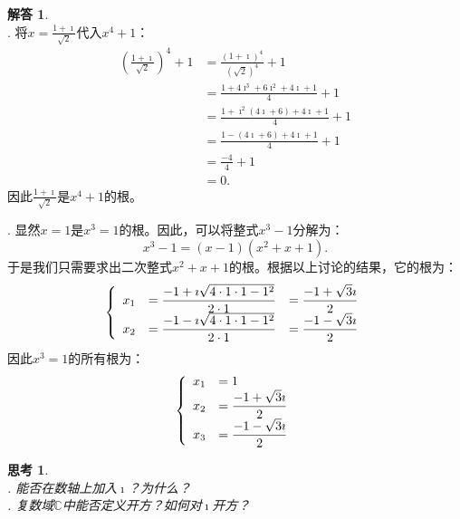 \documentclass[12pt,UTF8]{ctexbook}
\theoremstyle{definition}
\newtheorem*{so}{解答}
\theoremstyle{plain}
\newtheorem{sk}{思考}[section]
\begin{document}
\begin{so}
    \mbox{} \\
    . 将$x = \displaystyle\frac{1 + \imath}{\sqrt{2}}$代入$x^4 + 1$：
    \begin{align*}
        \left(\frac{1 + \imath}{\sqrt{2}}\right)^4 + 1 &= \frac{\left(1 + \imath\right)^4}{\left(\sqrt{2}\right)^4} + 1 \\
        &= \frac{1 + 4\imath^3 + 6\imath^2 + 4\imath + 1}{4} + 1 \\
        &= \frac{1 + \imath^2 (4\imath + 6) + 4\imath + 1}{4} + 1 \\
        &= \frac{1 - (4\imath + 6) + 4\imath + 1}{4} + 1 \\
        &= \frac{- 4}{4} + 1 \\
        &= 0.
    \end{align*}
    因此$\displaystyle\frac{1 + \imath}{\sqrt{2}}$是$x^4 + 1$的根。

    . 显然$x = 1$是$x^3 = 1$的根。因此，可以将整式$x^3 - 1$分解为：
    $$ x^3 - 1 = (x - 1)(x^2 + x + 1).$$
    于是我们只需要求出二次整式$x^2 + x + 1$的根。根据以上讨论的结果，它的根为：
    $$
    \left\{
        \begin{array}[]{rll}
            x_1 &= \displaystyle\frac{-1 + \imath \sqrt{4\cdot 1\cdot 1 - 1^2} }{2\cdot 1} &= \displaystyle\frac{-1 + \sqrt{3}\imath}{2} \\
            x_2 &= \displaystyle\frac{-1 - \imath \sqrt{4\cdot 1\cdot 1 - 1^2} }{2\cdot 1} &= \displaystyle\frac{-1 - \sqrt{3}\imath}{2} \\
        \end{array}
    \right.
    $$
    因此$x^3 = 1$的所有根为：
    $$
    \left\{
        \begin{array}[]{rl}
            x_1 &= 1 \\
            x_2 &= \displaystyle\frac{-1 + \sqrt{3}\imath}{2} \\
            x_3 &= \displaystyle\frac{-1 - \sqrt{3}\imath}{2} \\
        \end{array}
    \right.
    $$
\end{so}

\begin{sk}
    \mbox{} \\
    . 能否在数轴上加入$\imath$？为什么？\\
    . 复数域$\mathbb{C}$中能否定义开方？如何对$\imath$开方？
\end{sk}
\end{document}
